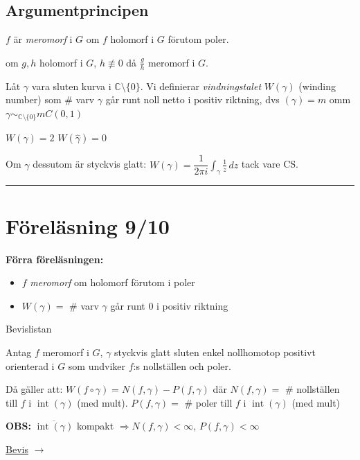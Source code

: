 \subsection{Argumentprincipen}
\begin{definition}
$f$ är \emph{meromorf} i $G$ om $f$ holomorf i $G$ förutom poler.
\end{definition}

\begin{example}
om $g, h$ holomorf i $G$, $h \not\equiv 0$ då $\frac{g}{h}$ meromorf i $G$.
\end{example}

\begin{definition}
Låt $\gamma$ vara sluten kurva i $\mathbb{C} \setminus \{0\}$. Vi definierar \emph{vindningstalet} $W(\gamma)$ (winding number) som \# varv $\gamma$ går runt noll netto i positiv riktning, dvs $(\gamma) = m$ omm $\gamma \sim_{\mathbb{C} \setminus \{0\}} mC(0, 1)$
\end{definition}

\begin{example}
\underline{$W(\gamma) = 2$} \qquad \underline{$W(\hat{\gamma}) = 0$}
\end{example}

\textcolor{red!70!black}{} Om $\gamma$ dessutom är styckvis glatt: $W(\gamma) = \dfrac{1}{2\pi i} \displaystyle\int_\gamma \frac{1}{z}\,dz$ tack vare CS.

\noindent\rule{\linewidth}{0.4pt}

\section{Föreläsning 9/10}
\textbf{Förra föreläsningen:}
\begin{itemize}
  \item $f$ \emph{meromorf} om holomorf förutom i poler
  \item $W(\gamma) = $ \# varv $\gamma$ går runt $0$ i positiv riktning
\end{itemize}

\begin{theorem}[Argumentprincipen]
\hfill \textcolor{magenta!80!black}{Bevislistan}

Antag $f$ meromorf i $G$, $\gamma$ styckvis glatt sluten enkel nollhomotop positivt orienterad i $G$ som undviker $f$:s nollställen och poler.

Då gäller att: $W(f \circ \gamma) = N(f, \gamma) - P(f, \gamma)$ där $N(f, \gamma) = $ \# nollställen till $f$ i $\operatorname{int}(\gamma)$ (med mult). $P(f, \gamma) = $ \# poler till $f$ i $\operatorname{int}(\gamma)$ (med mult)
\end{theorem}

\begin{example}
\end{example}

\textcolor{red!70!black}{\textbf{OBS:}} $\overline{\operatorname{int}(\gamma)}$ kompakt $\Rightarrow N(f, \gamma) < \infty$, $P(f, \gamma) < \infty$

\hfill \textcolor{red!70!black}{\underline{Bevis}} $\longrightarrow$
